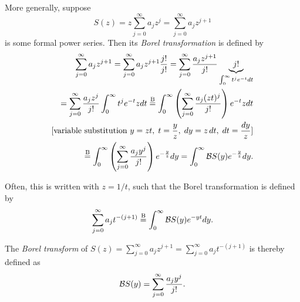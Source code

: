 More generally, suppose
\begin{equation}
S(z)= z \sum_{j=0}^\infty
a_j  z^j  = \sum_{j=0}^\infty
a_j  z^{j+1}
\label{2018-m-ch-ds-fps}
\end{equation}
is some formal power series.
Then  its {\em Borel transformation}
is defined by
\begin{equation}
\begin{split}
\sum_{j=0}^\infty
a_j z^{j+1}
=
\sum_{j=0}^\infty
a_j z^{j+1}  \frac{j!}{j!}
=
\sum_{j=0}^\infty
  \frac{a_j z^{j+1} }{j!}  \underbrace{j!}_{ \int_0^\infty t^j e^{-t}   dt }  \\
=
\sum_{j=0}^\infty
  \frac{a_jz^{j} }{j!}  \int_0^\infty t^j e^{-t} z dt
\stackrel{{\rm B}}{=}
\int_0^\infty \left(\sum_{j=0}^\infty   \frac{a_j (z t)^j}{j!}\right)  e^{-t} z dt \\
[\textrm{variable substitution }  y= z t, \; t = \frac{y}{z}  , \; dy = z \,dt, \; dt = \frac{dy}{z}]\\
\stackrel{{\rm B}}{=}
\int_0^\infty \left(\sum_{j=0}^\infty   \frac{a_j y^j}{j!}\right)  e^{-\frac{y}{z}}   dy  =
\int_0^\infty {\cal B}S (y)  e^{-\frac{y}{z}}   dy
.
\end{split}
\label{2012-m-ch-dsboreltrafo}
\end{equation}

Often, this is written with $z=1/t$, such that the  Borel transformation
is defined by
\begin{equation}
\begin{split}
\sum_{j=0}^\infty
a_j t^{-(j+1)}
\stackrel{{\rm B}}{=}
\int_0^\infty {\cal B}S (y)  e^{- yt }   dy
.
\end{split}
\label{2012-m-ch-dsboreltrafo2}
\end{equation}


The {\em Borel transform}
of   $S(z)=   \sum_{j=0}^\infty
a_j  z^{j+1} =  \sum_{j=0}^\infty
a_j  t^{-(j+1)}$
is thereby defined as
\begin{equation}
{\cal B}S (y)
=
  \sum_{j=0}^\infty   \frac{a_j y^j}{j!}
.
\label{2012-m-ch-dsboreltransform}
\end{equation}



